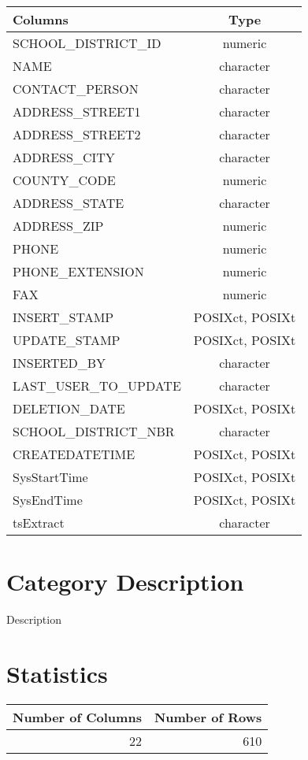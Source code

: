\documentclass[
  letterpaper,
  DIV=11,
  numbers=noendperiod]{scrreprt}
\begin{document}
\begin{longtable}{lc}
\toprule
Columns & Type \\ 
\midrule
SCHOOL\_DISTRICT\_ID & numeric \\ 
NAME & character \\ 
CONTACT\_PERSON & character \\ 
ADDRESS\_STREET1 & character \\ 
ADDRESS\_STREET2 & character \\ 
ADDRESS\_CITY & character \\ 
COUNTY\_CODE & numeric \\ 
ADDRESS\_STATE & character \\ 
ADDRESS\_ZIP & numeric \\ 
PHONE & numeric \\ 
PHONE\_EXTENSION & numeric \\ 
FAX & numeric \\ 
INSERT\_STAMP & POSIXct, POSIXt \\ 
UPDATE\_STAMP & POSIXct, POSIXt \\ 
INSERTED\_BY & character \\ 
LAST\_USER\_TO\_UPDATE & character \\ 
DELETION\_DATE & POSIXct, POSIXt \\ 
SCHOOL\_DISTRICT\_NBR & character \\ 
CREATEDATETIME & POSIXct, POSIXt \\ 
SysStartTime & POSIXct, POSIXt \\ 
SysEndTime & POSIXct, POSIXt \\ 
tsExtract & character \\ 
\bottomrule
\end{longtable}

\hypertarget{category-description-35}{%
\section*{Category Description}\label{category-description-35}}

Description

\hypertarget{statistics-35}{%
\section*{Statistics}\label{statistics-35}}

\begin{longtable}{rr}
\toprule
Number of Columns & Number of Rows \\ 
\midrule
22 & 610 \\ 
\bottomrule
\end{longtable}
\end{document}

